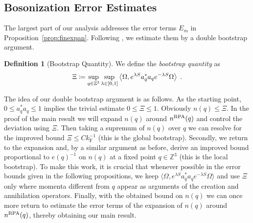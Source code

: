 \documentclass[12pt,a4paper]{article}
\numberwithin{equation}{section}
\newcommand{\Zbb}{\mathbb{Z}}
\newcommand{\1}{\mathbb{I}}
\newcommand{\F}{\mathrm{F}}
\newcommand{\kF}{k_\F}
\newcommand{\Z}{\mathbb{Z}}
\theoremstyle{plain}
\theoremstyle{definition}
\newtheorem{definition}[theorem]{Definition}
\theoremstyle{remark}
\theoremstyle{plain}
\theoremstyle{definition}
\theoremstyle{remark}
\begin{document}
\subsection{Bosonization Error Estimates}
\label{subsec:bos_error}

The largest part of our analysis addresses the error terms $ E_m $ in Proposition~\ref{prop:finexpan}. Following \cite{BL25}, we estimate them by a double bootstrap argument.

\begin{definition}[Bootstrap Quantity] We define the \emph{bootstrap quantity} as
\begin{equation} \label{eq:Xi}
	\Xi \coloneq \sup\limits_{q \in \Z^3} \sup\limits_{\lambda \in [0,1]}\expval{\Omega, e^{\lambda S} a^*_q a_q e^{-\lambda S} \Omega} \;.
\end{equation}
\end{definition}

The idea of our double bootstrap argument is as follows. As the starting point, $ 0 \le a_q^* a_q \le 1 $ implies the trivial estimate $ 0 \le \Xi \le 1 $. Obviously $n(q) \leq \Xi$. In the proof of the main result we will expand $n(q)$ around $n^\textnormal{RPA}(q)$ and control the deviation using $\Xi$. Then taking a supremum  of $n(q)$ over $q$ we can resolve for the improved bound $\Xi \leq C \kF^{-1}$ (this is the global bootstrap). Secondly, we return to the expansion and, by a similar argument as before, derive an improved bound proportional to $e(q)^{-1}$ on $n(q)$ at a fixed point $q \in \Zbb^3$ (this is the local bootstrap). To make this work, it is crucial that whenever possible in the error bounds given in the following propositions, we keep $\langle \Omega, e^{\lambda S} a^*_q a_q e^{-\lambda S} \Omega \rangle$ and use $\Xi$ only where momenta different from $q$ appear as arguments of the creation and annihilation operators. Finally, with the obtained bound on $n(q)$ we can once more return to estimate the error terms of the expansion of $n(q)$ around $n^\textnormal{RPA}(q)$, thereby obtaining our main result.
\end{document}
